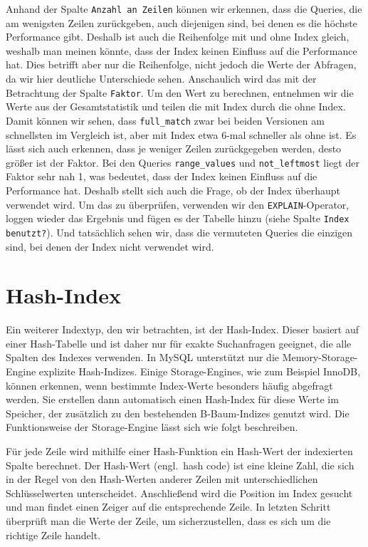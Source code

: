 Anhand der Spalte \texttt{Anzahl an Zeilen} können wir erkennen, dass die Queries, die am wenigsten Zeilen zurückgeben, auch diejenigen sind, bei denen es die höchste Performance gibt.
Deshalb ist auch die Reihenfolge mit und ohne Index gleich, weshalb man meinen könnte, dass der Index keinen Einfluss auf die Performance hat.
Dies betrifft aber nur die Reihenfolge, nicht jedoch die Werte der Abfragen, da wir hier deutliche Unterschiede sehen.
Anschaulich wird das mit der Betrachtung der Spalte \texttt{Faktor}.
Um den Wert zu berechnen, entnehmen wir die Werte aus der Gesamtstatistik und teilen die mit Index durch die ohne Index.
Damit können wir sehen, dass \texttt{full\_match} zwar bei beiden Versionen am schnellsten im Vergleich ist, aber mit Index etwa 6-mal schneller als ohne ist.
Es lässt sich auch erkennen, dass je weniger Zeilen zurückgegeben werden, desto größer ist der Faktor.
Bei den Queries \texttt{range\_values} und \texttt{not\_leftmost} liegt der Faktor sehr nah 1, was bedeutet, dass der Index keinen Einfluss auf die Performance hat.
Deshalb stellt sich auch die Frage, ob der Index überhaupt verwendet wird.
Um das zu überprüfen, verwenden wir den \texttt{EXPLAIN}-Operator, loggen wieder das Ergebnis und fügen es der Tabelle hinzu (siehe Spalte \texttt{Index benutzt?}).
Und tatsächlich sehen wir, dass die vermuteten Queries die einzigen sind, bei denen der Index nicht verwendet wird.

\section{Hash-Index}\label{sec:indexing-hash-index}
Ein weiterer Indextyp, den wir betrachten, ist der Hash-Index.
Dieser basiert auf einer Hash-Tabelle und ist daher nur für exakte Suchanfragen geeignet, die alle Spalten des Indexes verwenden.
In MySQL unterstützt nur die Memory-Storage-Engine explizite Hash-Indizes.
Einige Storage-Engines, wie zum Beispiel InnoDB, können erkennen, wenn bestimmte Index-Werte besonders häufig abgefragt werden.
Sie erstellen dann automatisch einen Hash-Index für diese Werte im Speicher, der zusätzlich zu den bestehenden B-Baum-Indizes genutzt wird.
Die Funktionsweise der Storage-Engine lässt sich wie folgt beschreiben.

Für jede Zeile wird mithilfe einer Hash-Funktion ein Hash-Wert der indexierten Spalte berechnet.
Der Hash-Wert (engl.\ hash code) ist eine kleine Zahl, die sich in der Regel von den Hash-Werten anderer Zeilen mit unterschiedlichen Schlüsselwerten unterscheidet.
Anschließend wird die Position im Index gesucht und man findet einen Zeiger auf die entsprechende Zeile.
In letzten Schritt überprüft man die Werte der Zeile, um sicherzustellen, dass es sich um die richtige Zeile handelt.

